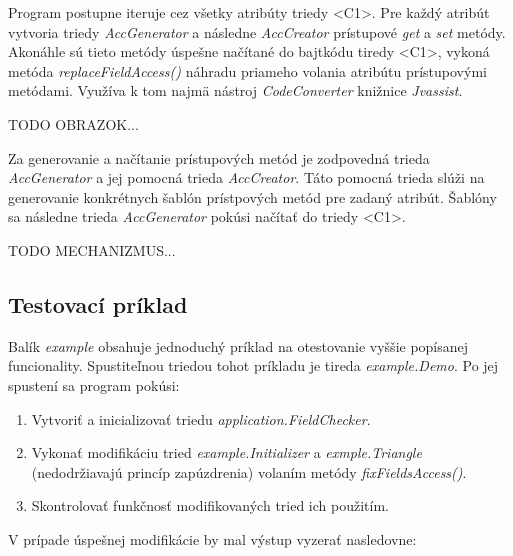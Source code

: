 \documentclass[11pt,final,oneside]{fithesis}
\begin{document}
Program postupne iteruje cez všetky atribúty triedy <C1>. Pre každý atribút vytvoria triedy \textit{AccGenerator} a následne \textit{AccCreator} prístupové \textit{get} a \textit{set} metódy. Akonáhle sú tieto metódy úspešne načítané do bajtkódu tiredy <C1>, vykoná metóda \textit{replaceFieldAccess()} náhradu priameho volania atribútu prístupovými metódami.
Využíva k tom najmä nástroj \textit{CodeConverter} knižnice \textit{Jvassist}.

TODO OBRAZOK...

Za generovanie a načítanie prístupových metód je zodpovedná trieda \textit{AccGenerator} a jej pomocná trieda \textit{AccCreator}. Táto pomocná trieda slúži na generovanie konkrétnych šablón prístpových metód pre zadaný atribút. Šablóny sa následne trieda \textit{AccGenerator} pokúsi načítať do triedy <C1>.


TODO MECHANIZMUS...

\subsection{Testovací príklad}
Balík \textit{example} obsahuje jednoduchý príklad na otestovanie vyššie popísanej funcionality. Spustiteľnou triedou tohot príkladu je tireda \textit{example.Demo}. Po jej spustení sa program pokúsi:

\begin{enumerate}
\item Vytvoriť a inicializovať triedu \textit{application.FieldChecker}.
\item Vykonať modifikáciu tried \textit{example.Initializer} a \textit{exmple.Triangle} (nedodržiavajú princíp zapúzdrenia) volaním metódy \textit{fixFieldsAccess()}.
\item Skontrolovať funkčnosť modifikovaných tried ich použitím.
\end{enumerate}

V prípade úspešnej modifikácie by mal výstup vyzerať nasledovne:
\end{document}
